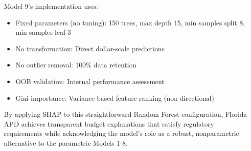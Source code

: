 Model 9's implementation uses:
\begin{itemize}
    \item Fixed parameters (no tuning): 150 trees, max depth 15, min samples split 8, min samples leaf 3
    \item No transformation: Direct dollar-scale predictions
    \item No outlier removal: 100\% data retention
    \item OOB validation: Internal performance assessment
    \item Gini importance: Variance-based feature ranking (non-directional)
\end{itemize}

By applying SHAP to this straightforward Random Forest configuration, Florida APD achieves transparent budget explanations that satisfy regulatory requirements while acknowledging the model's role as a robust, nonparametric alternative to the parametric Models 1-8.
